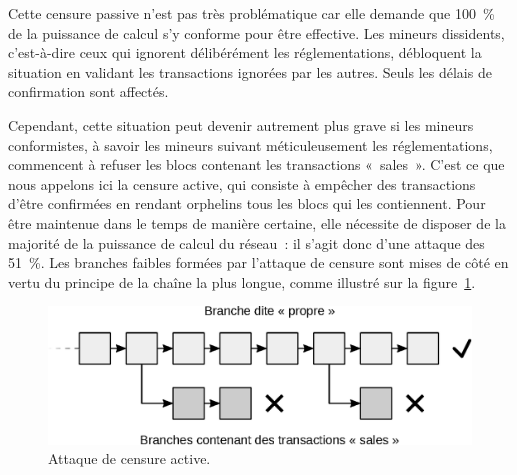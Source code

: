 Cette censure passive n'est pas très problématique car elle demande que 100~\% de la puissance de calcul s'y conforme pour être effective. Les mineurs dissidents, c'est-à-dire ceux qui ignorent délibérément les réglementations, débloquent la situation en validant les transactions ignorées par les autres. Seuls les délais de confirmation sont affectés.

Cependant, cette situation peut devenir autrement plus grave si les mineurs conformistes, à savoir les mineurs suivant méticuleusement les réglementations, commencent à refuser les blocs contenant les transactions «~sales~». C'est ce que nous appelons ici la censure active, qui consiste à empêcher des transactions d'être confirmées en rendant orphelins tous les blocs qui les contiennent. Pour être maintenue dans le temps de manière certaine, elle nécessite de disposer de la majorité de la puissance de calcul du réseau~: il s'agit donc d'une attaque des 51~\%. Les branches faibles formées par l'attaque de censure sont mises de côté en vertu du principe de la chaîne la plus longue, comme illustré sur la figure~\ref{fig:censorship-attack}.

\begin{figure}[h]
  \centering
  \includegraphics[scale=0.7]{img/mining-attack-censorship.eps}
  \caption{Attaque de censure active.}
  \label{fig:censorship-attack}
\end{figure}


